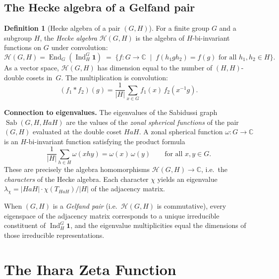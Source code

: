 \documentclass[11pt,a4paper]{article}
\theoremstyle{plain}
\theoremstyle{definition}
\newtheorem{definition}[theorem]{Definition}
\newcommand{\C}{\mathbb{C}}
\newcommand{\Sab}{\operatorname{Sab}}
\newcommand{\Ind}{\operatorname{Ind}}
\newcommand{\End}{\operatorname{End}}
\begin{document}
\subsection{The Hecke algebra of a Gelfand pair}

\begin{tcolorbox}[breakable, colback=green!8, colframe=green!8,
  boxrule=0pt, sharp corners]
\begin{definition}[Hecke algebra of a pair $(G, H)$]
\label{def:hecke-pair}
For a finite group $G$ and a subgroup $H$, the \emph{Hecke algebra}
$\mathcal{H}(G, H)$ is the algebra of $H$-bi-invariant functions on
$G$ under convolution:
\[
  \mathcal{H}(G, H) = \End_G\!\left(\Ind_H^G \mathbf{1}\right)
  \;=\; \{f : G \to \C \;\mid\; f(h_1 g h_2) = f(g)
  \text{ for all } h_1, h_2 \in H\}.
\]
As a vector space, $\mathcal{H}(G, H)$ has dimension equal to the
number of $(H, H)$-double cosets in~$G$. The multiplication is
convolution:
\[
  (f_1 * f_2)(g) = \frac{1}{|H|} \sum_{x \in G} f_1(x)\, f_2(x^{-1}g).
\]
\end{definition}
\end{tcolorbox}

\begin{tcolorbox}[breakable, colback=yellow!12, colframe=yellow!12,
  boxrule=0pt, sharp corners]
\textbf{Connection to eigenvalues.}
The eigenvalues of the Sabidussi graph $\Sab(G, H, HaH)$ are the
values of the \emph{zonal spherical functions} of the pair $(G, H)$
evaluated at the double coset $HaH$. A zonal spherical function
$\omega : G \to \C$ is an $H$-bi-invariant function satisfying the
product formula
\[
  \frac{1}{|H|} \sum_{h \in H} \omega(xhy) = \omega(x)\,\omega(y)
  \qquad \text{for all } x, y \in G.
\]
These are precisely the algebra homomorphisms
$\mathcal{H}(G, H) \to \C$, i.e.\ the \emph{characters} of the
Hecke algebra. Each character $\chi$ yields an eigenvalue
$\lambda_\chi = |HaH| \cdot \chi(T_{HaH}) / |H|$ of the adjacency
matrix.

When $(G, H)$ is a \emph{Gelfand pair} (i.e.\ $\mathcal{H}(G, H)$
is commutative), every eigenspace of the adjacency matrix corresponds
to a unique irreducible constituent of $\Ind_H^G \mathbf{1}$, and
the eigenvalue multiplicities equal the dimensions of those
irreducible representations.
\end{tcolorbox}


\section{The Ihara Zeta Function}
\label{sec:ihara}
\end{document}
